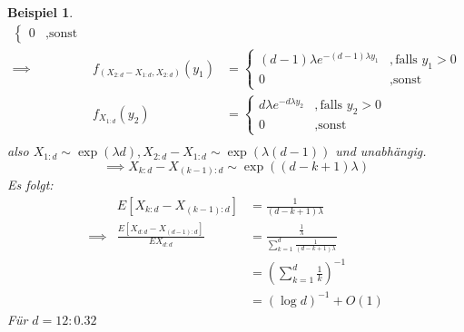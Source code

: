 \documentclass[a4paper,11pt]{book}
\def\folgt{\ensuremath{\implies}}
\newtheorem{Bsp}{Beispiel}[chapter]
\theoremstyle{nonumberplain}
\renewcommand{\indexname}{Stichwortverzeichnis}
\begin{document}
\begin{Bsp}
\begin{eqnarray*}
\begin{cases}
0&,\text{sonst}
\end{cases}\\
\folgt&f_{(X_{2:d}-X_{1:d},X_{2:d})}(y_1)&=\begin{cases}
(d-1)\lambda e^{-(d-1)\lambda y_1} &,\text{falls } y_1>0\\
0&,\text{sonst}
\end{cases}\\
&f_{X_{1:d}}(y_2)&=\begin{cases}
d\lambda e^{-d\lambda y_2} &,\text{falls } y_2>0\\
0&,\text{sonst}
\end{cases}\\
\end{eqnarray*}
also $X_{1:d}\sim\exp(\lambda d), X_{2:d}-X_{1:d}\sim\exp(\lambda(d-1))$ und unabhängig.
$$\folgt X_{k:d}-X_{(k-1):d}\sim\exp((d-k+1)\lambda)$$
Es folgt:
\begin{eqnarray*}
&E[X_{k:d}-X_{(k-1):d}]&=\frac{1}{(d-k+1)\lambda}\\
\folgt & \frac{E[X_{d:d}-X_{(d-1):d}]}{EX_{d:d}} &=\frac{\frac 1 \lambda}{\sum_{k=1}^d\frac{1}{(d-k+1)\lambda}}\\
& &=\left(\sum_{k=1}^d\frac 1 k\right)^{-1}\\
& &=(\log d)^{-1}+O(1)
\end{eqnarray*}
Für $d=12: 0.32$
\end{Bsp}

\newpage
\renewcommand{\indexname}{Stichwortverzeichnis}

\printindex
\end{document}
